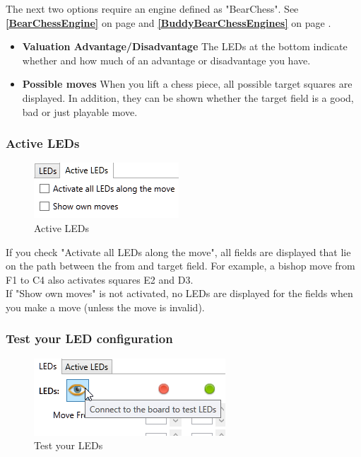 \documentclass[11pt,a4paper]{article}
\begin{document}
The next two options require an engine defined as "BearChess". See \textbf{\ref{BearChessEngine}  } on page \pageref{BearChessEngine} and \textbf{\ref{BuddyBearChessEngines}  } on page \pageref{BuddyBearChessEngines}.

\begin{itemize}
	\item \textbf{Valuation Advantage/Disadvantage} The LEDs at the bottom indicate whether and how much of an advantage or disadvantage you have.
	\item \textbf{Possible moves} When you lift a chess piece, all possible target squares are displayed. In addition, they can be shown whether the target field is a good, bad or just playable move.
\end{itemize}


\subsubsection{Active LEDs}

\begin{figure}[H]
	\centering
	\includegraphics[scale=1.0]{iChessOne4.png}
	\caption{Active LEDs }
	\label{fig:iChessOne7}
\end{figure}
If you check "Activate all LEDs along the move", all fields are displayed that lie on the path between the from and target field. For example, a bishop move from F1 to C4 also activates squares E2 and D3.\\
If "Show own moves" is not activated, no LEDs are displayed for the fields when you make a move (unless the move is invalid).

\subsubsection{Test your LED configuration}

\begin{figure}[H]
	\centering
	\includegraphics[scale=1.0]{iChessOne5.png}
	\caption{Test your LEDs }
	\label{fig:iChessOne8}
\end{figure}
\end{document}
